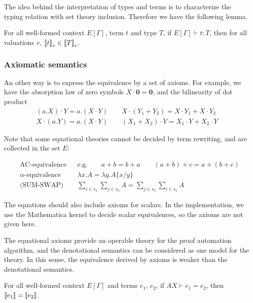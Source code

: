 \documentclass[runningheads]{llncs}
\begin{document}
The idea behind the interpretation of types and terms is to characterize the typing relation with set theory inclusion. Therefore we have the following lemma.
\begin{lemma}
    For all well-formed context $E[\Gamma]$, term $t$ and type $T$, if $E[\Gamma]\vdash t : T$, then for all valuations $v$, ${\llbracket t \rrbracket}_v \in {\llbracket T \rrbracket}_v$.
\end{lemma}


\subsubsection{Axiomatic semantics} 
An other way is to express the equivalence by a set of axioms. 
For example, we have the absorption law of zero symbols $X \cdot \mathbf{0} = \mathbf{0}$, and the bilinearity of dot product
\begin{align*}
    (a.X) \cdot Y = a.(X \cdot Y) \qquad X \cdot (Y_1 + Y_2) = X \cdot Y_1 + X \cdot Y_2 \\
    X \cdot (a.Y) = a.(X \cdot Y) \qquad (X_1 + X_2) \cdot Y = X_1 \cdot Y + X_2 \cdot Y
\end{align*}

Note that some equational theories cannot be decided by term rewriting, and are collected in the set $E$:

\begin{align*}
    & \textrm{AC-equivalence} 
    && \textrm{e.g.} \qquad a + b = b + a \qquad (a + b) + c = a + (b + c) \\
    & \textrm{$\alpha$-equivalence}
    && \lambda x . A = \lambda y . A\{x/y\} \\
    & \textrm{(SUM-SWAP)}
    && \sum_{i \in s_1} \sum_{j \in s_2} A = \sum_{j \in s_2} \sum_{i \in s_1} A
\end{align*}

The equations should also include axioms for scalars. In the implementation, we use the Mathematica kernel to decide scalar equivalences, so the axioms are not given here.

The equational axioms provide an operable theory for the proof automation algorithm,
and the denotational semantics can be considered as one model for the theory.
In this sense, the equivalence derived by axioms is weaker than the denotational semantics.

\begin{lemma}
    For all well-formed context $E[\Gamma]$ and terms $e_1$, $e_2$, if $AX \vdash e_1 = e_2$, then ${\llbracket e_1 \rrbracket} = {\llbracket e_2 \rrbracket}$.
\end{lemma}
\end{document}
